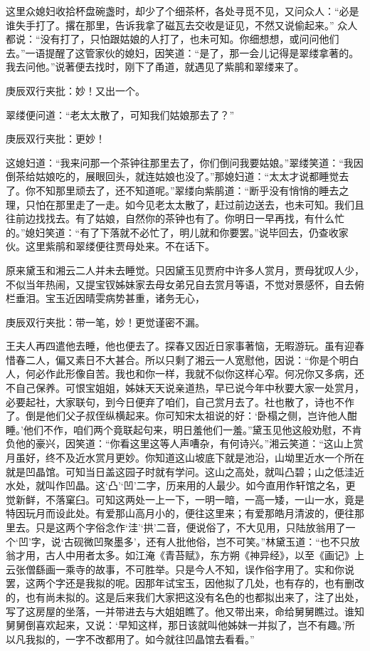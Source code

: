 \begin{parag}


    这里众媳妇收拾杯盘碗盏时，却少了个细茶杯，各处寻觅不见，又问众人：“必是谁失手打了。撂在那里，告诉我拿了磁瓦去交收是证见，不然又说偷起来。” 众人都说：“没有打了，只怕跟姑娘的人打了，也未可知。你细想想，或问问他们去。”一语提醒了这管家伙的媳妇，因笑道：“是了，那一会儿记得是翠缕拿著的。我去问他。”说著便去找时，刚下了甬道，就遇见了紫鹃和翠缕来了。\begin{note}庚辰双行夹批：妙！又出一个。\end{note}翠缕便问道：“老太太散了，可知我们姑娘那去了？”\begin{note}庚辰双行夹批：更妙！\end{note}这媳妇道：“我来问那一个茶钟往那里去了，你们倒问我要姑娘。”翠缕笑道：“我因倒茶给姑娘吃的，展眼回头，就连姑娘也没了。”那媳妇道：“太太才说都睡觉去了。你不知那里顽去了，还不知道呢。”翠缕向紫鹃道：“断乎没有悄悄的睡去之理，只怕在那里走了一走。如今见老太太散了，赶过前边送去，也未可知。我们且往前边找找去。有了姑娘，自然你的茶钟也有了。你明日一早再找，有什么忙的。”媳妇笑道：“有了下落就不必忙了，明儿就和你要罢。”说毕回去，仍查收家伙。这里紫鹃和翠缕便往贾母处来。不在话下。
\end{parag}


\begin{parag}


    原来黛玉和湘云二人并未去睡觉。只因黛玉见贾府中许多人赏月，贾母犹叹人少，不似当年热闹，又提宝钗姊妹家去母女弟兄自去赏月等语，不觉对景感怀，自去俯栏垂泪。宝玉近因晴雯病势甚重，诸务无心，\begin{note}庚辰双行夹批：带一笔，妙！更觉谨密不漏。\end{note}王夫人再四遣他去睡，他也便去了。探春又因近日家事著恼，无暇游玩。虽有迎春惜春二人，偏又素日不大甚合。所以只剩了湘云一人宽慰他，因说：“你是个明白人，何必作此形像自苦。我也和你一样，我就不似你这样心窄。何况你又多病，还不自己保养。可恨宝姐姐，姊妹天天说亲道热，早已说今年中秋要大家一处赏月，必要起社，大家联句，到今日便弃了咱们，自己赏月去了。社也散了，诗也不作了。倒是他们父子叔侄纵横起来。你可知宋太祖说的好：‘卧榻之侧，岂许他人酣睡。’他们不作，咱们两个竟联起句来，明日羞他们一羞。”黛玉见他这般劝慰，不肯负他的豪兴，因笑道：“你看这里这等人声嘈杂，有何诗兴。”湘云笑道：“这山上赏月虽好，终不及近水赏月更妙。你知道这山坡底下就是池沿，山坳里近水一个所在就是凹晶馆。可知当日盖这园子时就有学问。这山之高处，就叫凸碧；山之低洼近水处，就叫作凹晶。这‘凸’‘凹’二字，历来用的人最少。如今直用作轩馆之名，更觉新鲜，不落窠臼。可知这两处一上一下，一明一暗，一高一矮，一山一水，竟是特因玩月而设此处。有爱那山高月小的，便往这里来；有爱那皓月清波的，便往那里去。只是这两个字俗念作‘洼’‘拱’二音，便说俗了，不大见用，只陆放翁用了一个‘凹’字，说‘古砚微凹聚墨多’，还有人批他俗，岂不可笑。”林黛玉道：“也不只放翁才用，古人中用者太多。如江淹《青苔赋》，东方朔《神异经》，以至《画记》上云张僧繇画一乘寺的故事，不可胜举。只是今人不知，误作俗字用了。实和你说罢，这两个字还是我拟的呢。因那年试宝玉，因他拟了几处，也有存的，也有删改的，也有尚未拟的。这是后来我们大家把这没有名色的也都拟出来了，注了出处，写了这房屋的坐落，一并带进去与大姐姐瞧了。他又带出来，命给舅舅瞧过。谁知舅舅倒喜欢起来，又说：‘早知这样，那日该就叫他姊妹一并拟了，岂不有趣。’所以凡我拟的，一字不改都用了。如今就往凹晶馆去看看。”
\end{parag}


